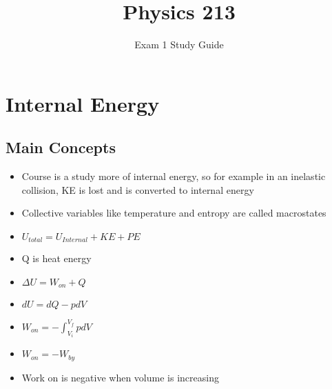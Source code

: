 \documentclass{article}
\title{Physics 213}
\date{\vspace{-5ex}}
\author{Exam 1 Study Guide}
\begin{document}
\maketitle
\section{Internal Energy}
\subsection{Main Concepts}
\begin{itemize}
	\item Course is a study more of internal energy, so for example in an inelastic collision, KE is lost and is converted to internal energy
	\item Collective variables like temperature and entropy are called macrostates
	\item $U_{total} = U_{Internal} + KE + PE$
	\item Q is heat energy
	\item $\Delta U = W_{on} + Q$
	\item $dU = dQ - pdV$
	\item $W_{on} = - \int ^{V_{f}}_{V_{i}} pdV$
	\item $W_{on} = -W_{by} $
	\item Work on is negative when volume is increasing
\end{itemize}
\end{document}
